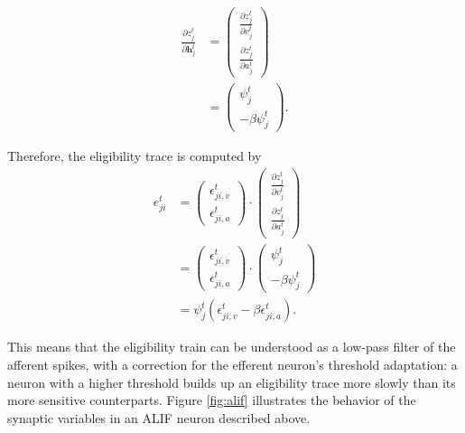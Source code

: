            \begin{align}
                \frac{\partial z^t_j}{\partial\mathbf{h}^t_j} &= \begin{pmatrix}
                    \frac{\partial z^t_j}{\partial v^t_j}\\
                    \frac{\partial z^t_j}{\partial a^t_j}
                    \end{pmatrix}\\
                &= \begin{pmatrix}
                    \psi^t_j\\
                    -\beta\psi^t_j
                    \end{pmatrix}.
            \end{align}

            Therefore, the eligibility trace is computed by
            \begin{align}
               e^t_{ji} &= \begin{pmatrix}
            \epsilon_{ji, v}^t\\
            \epsilon_{ji, a}^t
            \end{pmatrix}\cdot \begin{pmatrix}
                    \frac{\partial z^t_j}{\partial v^t_j}\\
                    \frac{\partial z^t_j}{\partial a^t_j}
                    \end{pmatrix}\\
                &= \begin{pmatrix}
            \epsilon_{ji, v}^t\\
            \epsilon_{ji, a}^t
            \end{pmatrix}\cdot \begin{pmatrix}
                    \psi^t_j\\
                    -\beta\psi^t_j
                    \end{pmatrix}\\
                    &= \psi^t_j\left(\epsilon_{ji, v}^t - \beta\epsilon_{ji, a}^t\right).
            \end{align}


            This means that the eligibility train can be understood as a low-pass filter of the afferent spikes, with a correction for the efferent neuron's threshold adaptation: a neuron with a higher threshold builds up an eligibility trace more slowly than its more sensitive counterparts.
            Figure \ref{fig:alif} illustrates the behavior of the synaptic variables in an ALIF neuron described above.

